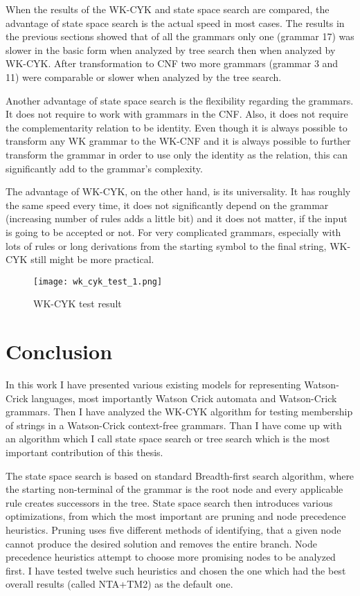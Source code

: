 When the results of the WK-CYK and state space search are compared, the advantage of state space search is the actual speed in most cases. The results in the previous sections showed that of all the grammars only one (grammar 17) was slower in the basic form when analyzed by tree search then when analyzed by WK-CYK. After transformation to CNF two more grammars (grammar 3 and 11) were comparable or slower when analyzed by the tree search.

Another advantage of state space search is the flexibility regarding the grammars. It does not require to work with grammars in the CNF. Also, it does not require the complementarity relation to be identity. Even though it is always possible to transform any WK grammar to the WK-CNF and it is always possible to further transform the grammar in order to use only the identity as the relation, this can significantly add to the grammar's complexity.

The advantage of WK-CYK, on the other hand, is its universality. It has roughly the same speed every time, it does not significantly depend on the grammar (increasing number of rules adds a little bit) and it does not matter, if the input is going to be accepted or not. For very complicated grammars, especially with lots of rules or long derivations from the starting symbol to the final string, WK-CYK still might be more practical.

\begin{figure}[h]
  \centering
  \texttt{[image: wk\_cyk\_test\_1.png]}
  \caption{WK-CYK test result}
  \label{fig:wk_cyk_test1}
\end{figure}

\chapter{Conclusion}
In this work I have presented various existing models for representing Watson-Crick languages, most importantly Watson Crick automata and Watson-Crick grammars. Then I have analyzed the WK-CYK algorithm for testing membership of strings in a Watson-Crick context-free grammars. Than I have come up with an algorithm which I call state space search or tree search which is the most important contribution of this thesis.

The state space search is based on standard Breadth-first search algorithm, where the starting non-terminal of the grammar is the root node and every applicable rule creates successors in the tree. State space search then introduces various optimizations, from which the most important are pruning and node precedence heuristics. Pruning uses five different methods of identifying, that a given node cannot produce the desired solution and removes the entire branch. Node precedence heuristics attempt to choose more promising nodes to be analyzed first. I have tested twelve such heuristics and chosen the one which had the best overall results (called NTA+TM2) as the default one.

